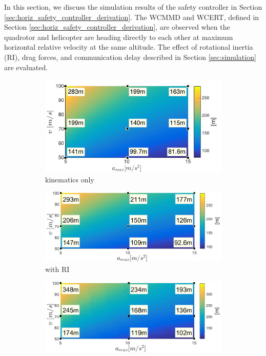 \documentclass[journal,11pt,onecolumn,draftclsnofoot,]{IEEEtran}
\begin{document}
In this section, we discuss the simulation results of the safety controller in Section \ref{sec:horiz_safety_controller_derivation}. The WCMMD and WCERT, defined in Section \ref{sec:horiz_safety_controller_derivation}, are observed when the quadrotor and helicopter are heading directly to each other at maximum horizontal relative velocity at the same altitude. The effect of rotational inertia (RI), drag forces, and communication delay described in Section \ref{sec:simulation} are evaluated.

\begin{figure}
	\centering
	\begin{subfigure}{.45\columnwidth}\centering%
		\includegraphics[width=\columnwidth]{WCMMD_horizontal_kinematics}
		\caption{kinematics only}
		\label{fig:WCMMD_horiz_kinematics}
	\end{subfigure}%
	\hfill
	\begin{subfigure}{.45\columnwidth}\centering
		\includegraphics[width=\columnwidth]{WCMMD_horizontal_RI}
		\caption{with RI}
		\label{fig:WCMMD_horiz_RI}
	\end{subfigure}%
	\hfill
	\begin{subfigure}{.45\columnwidth}\centering
		\includegraphics[width=\columnwidth]{WCMMD_horizontal_RI_drag}

\end{subfigure}
\end{figure}
\end{document}
